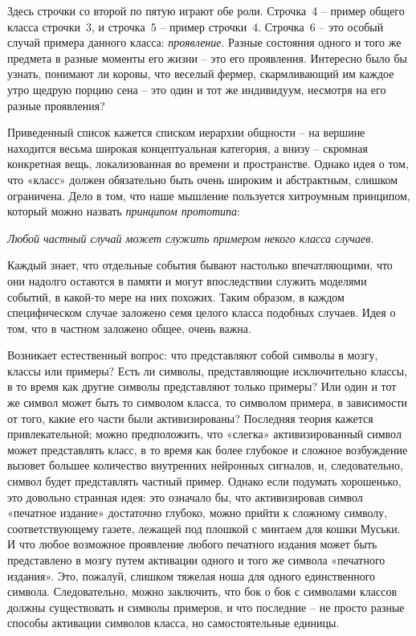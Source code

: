\documentclass[../main.tex]{subfiles}
\begin{document}
Здесь строчки со второй по пятую играют обе роли. Строчка~4 \--- пример общего класса строчки~3, и строчка~5 \--- пример строчки~4. Строчка~6 \--- это особый случай примера данного класса: \emph{проявление}. Разные состояния одного и того же предмета в разные моменты его жизни \--- это его проявления. Интересно было бы узнать, понимают ли коровы, что веселый фермер, скармливающий им каждое утро щедрую порцию сена \--- это один и тот же индивидуум, несмотря на его разные проявления?

Приведенный список кажется списком иерархии общности \--- на вершине находится весьма широкая концептуальная категория, а внизу \--- скромная конкретная вещь, локализованная во времени и пространстве. Однако идея о том, что «класс» должен обязательно быть очень широким и абстрактным, слишком ограничена. Дело в том, что наше мышление пользуется хитроумным принципом, который можно назвать \emph{принципом прототипа}:
\begin{center}
    \emph{Любой частный случай может служить примером некого класса случаев.}
\end{center}

Каждый знает, что отдельные события бывают настолько впечатляющими, что они надолго остаются в памяти и могут впоследствии служить моделями событий, в какой-то мере на них похожих. Таким образом, в каждом специфическом случае заложено семя целого класса подобных случаев. Идея о том, что в частном заложено общее, очень важна.

Возникает естественный вопрос: что представляют собой символы в мозгу, классы или примеры? Есть ли символы, представляющие исключительно классы, в то время как другие символы представляют только примеры? Или один и тот же символ может быть то символом класса, то символом примера, в зависимости от того, какие его части были активизированы? Последняя теория кажется привлекательной; можно предположить, что «слегка» активизированный символ может представлять класс, в то время как более глубокое и сложное возбуждение вызовет большее количество внутренних нейронных сигналов, и, следовательно, символ будет представлять частный пример. Однако если подумать хорошенько, это довольно странная идея: это означало бы, что активизировав символ «печатное издание» достаточно глубоко, можно прийти к сложному символу, соответствующему газете, лежащей под плошкой с минтаем для кошки Муськи. И что любое возможное проявление любого печатного издания может быть представлено в мозгу путем активации одного и того же символа «печатного издания». Это, пожалуй, слишком тяжелая ноша для одного единственного символа. Следовательно, можно заключить, что бок о бок с символами классов должны существовать и символы примеров, и что последние \--- не просто разные способы активации символов класса, но самостоятельные единицы.
\end{document}
